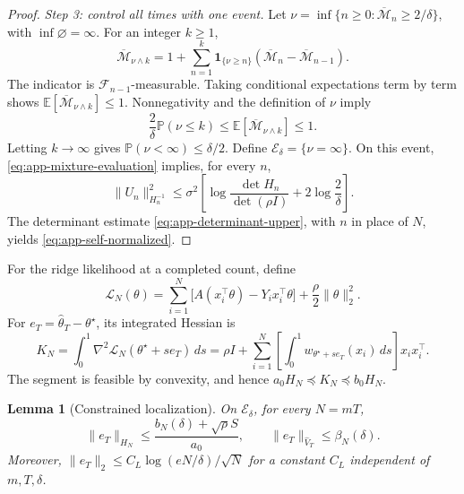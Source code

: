 \documentclass[10pt,twoside,letterpaper]{article}
\newtheorem{lemma}{Lemma}[section]
\newcommand{\E}{\mathbb E}
\newcommand{\Prob}{\mathbb P}
\newcommand{\norm}[1]{\lVert #1\rVert}
\newcommand{\thetahat}{\widehat\theta}
\newcommand{\Vhat}{\widehat V}
\begin{document}
\begin{proof}
\textit{Step 3: control all times with one event.}
Let $\nu=\inf\{n\ge0:\overline{\mathcal M}_n\ge2/\delta\}$, with
$\inf\varnothing=\infty$. For an integer $k\ge1$,
\begin{equation}
\overline{\mathcal M}_{\nu\wedge k}
=1+\sum_{n=1}^k\mathbf1_{\{\nu\ge n\}}
(\overline{\mathcal M}_n-\overline{\mathcal M}_{n-1}).
\label{eq:app-stopped-sum}
\end{equation}
The indicator is $\mathscr F_{n-1}$-measurable. Taking conditional
expectations term by term shows
$\E[\overline{\mathcal M}_{\nu\wedge k}]\le1$.
Nonnegativity and the definition of $\nu$ imply
\begin{equation}
\frac2\delta\Prob(\nu\le k)
\le\E[\overline{\mathcal M}_{\nu\wedge k}]\le1.
\label{eq:app-stopped-threshold}
\end{equation}
Letting $k\to\infty$ gives $\Prob(\nu<\infty)\le\delta/2$.
Define $\mathcal E_\delta=\{\nu=\infty\}$. On this event,
\eqref{eq:app-mixture-evaluation} implies, for every $n$,
\begin{equation}
\norm{U_n}_{H_n^{-1}}^2
\le\sigma^2\left[
\log\frac{\det H_n}{\det(\rho I)}+2\log\frac2\delta\right].
\label{eq:app-determinant-confidence}
\end{equation}
The determinant estimate \eqref{eq:app-determinant-upper}, with $n$
in place of $N$, yields \eqref{eq:app-self-normalized}.
\end{proof}

For the ridge likelihood at a completed count, define
\begin{equation}
\mathcal L_N(\theta)=\sum_{i=1}^N
\big[A(x_i^\top\theta)-Y_ix_i^\top\theta\big]
+\frac\rho2\norm{\theta}_2^2.
\label{eq:app-loss-definition}
\end{equation}
For $e_T=\thetahat_T-\theta^\star$, its integrated Hessian is
\begin{equation}
K_N=\int_0^1\nabla^2\mathcal L_N(\theta^\star+s e_T)\,ds
=\rho I+\sum_{i=1}^N
\left[\int_0^1w_{\theta^\star+s e_T}(x_i)\,ds\right]x_ix_i^\top.
\label{eq:app-integrated-hessian}
\end{equation}
The segment is feasible by convexity, and hence
$a_0H_N\preceq K_N\preceq b_0H_N$.

\begin{lemma}[Constrained localization]
\label{lem:localization}
On $\mathcal E_\delta$, for every $N=mT$,
\begin{equation}
\norm{e_T}_{H_N}\le\frac{b_N(\delta)+\sqrt\rho S}{a_0},
\qquad\norm{e_T}_{\Vhat_T}\le\beta_N(\delta).
\label{eq:app-confidence}
\end{equation}
Moreover, $\norm{e_T}_2\le C_L\log(eN/\delta)/\sqrt N$ for a constant
$C_L$ independent of $m,T,\delta$.
\end{lemma}
\end{document}
